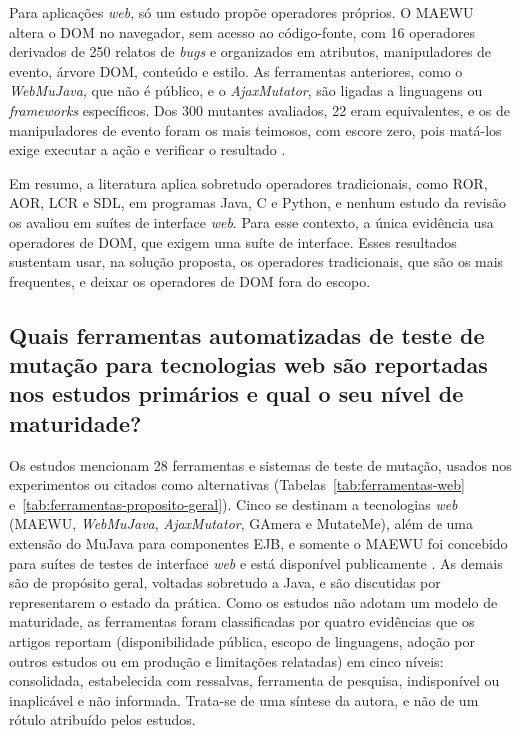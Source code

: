 Para aplicações \textit{web}, só um estudo propõe operadores próprios. O MAEWU altera o DOM no navegador, sem acesso ao código-fonte, com 16 operadores derivados de 250 relatos de \textit{bugs} e organizados em atributos, manipuladores de evento, árvore DOM, conteúdo e estilo. As ferramentas anteriores, como o \textit{WebMuJava}, que não é público, e o \textit{AjaxMutator}, são ligadas a linguagens ou \textit{frameworks} específicos. Dos 300 mutantes avaliados, 22 eram equivalentes, e os de manipuladores de evento foram os mais teimosos, com escore zero, pois matá-los exige executar a ação e verificar o resultado \cite{yandrapally2021}.

Em resumo, a literatura aplica sobretudo operadores tradicionais, como ROR, AOR, LCR e SDL, em programas Java, C e Python, e nenhum estudo da revisão os avaliou em suítes de interface \textit{web}. Para esse contexto, a única evidência usa operadores de DOM, que exigem uma suíte de interface. Esses resultados sustentam usar, na solução proposta, os operadores tradicionais, que são os mais frequentes, e deixar os operadores de DOM fora do escopo.

\subsection[Quais ferramentas são mais utilizadas na literatura?]{Quais ferramentas automatizadas de teste de mutação para tecnologias web são reportadas nos estudos primários e qual o seu nível de maturidade?}
\label{subsec:ferramentas-utilizadas}

Os estudos mencionam 28 ferramentas e sistemas de teste de mutação, usados nos experimentos ou citados como alternativas (Tabelas~\ref{tab:ferramentas-web} e~\ref{tab:ferramentas-proposito-geral}). Cinco se destinam a tecnologias \textit{web} (MAEWU, \textit{WebMuJava}, \textit{AjaxMutator}, GAmera e MutateMe), além de uma extensão do MuJava para componentes EJB, e somente o MAEWU foi concebido para suítes de testes de interface \textit{web} e está disponível publicamente \cite{yandrapally2021}. As demais são de propósito geral, voltadas sobretudo a Java, e são discutidas por representarem o estado da prática. Como os estudos não adotam um modelo de maturidade, as ferramentas foram classificadas por quatro evidências que os artigos reportam (disponibilidade pública, escopo de linguagens, adoção por outros estudos ou em produção e limitações relatadas) em cinco níveis: consolidada, estabelecida com ressalvas, ferramenta de pesquisa, indisponível ou inaplicável e não informada. Trata-se de uma síntese da autora, e não de um rótulo atribuído pelos estudos.

